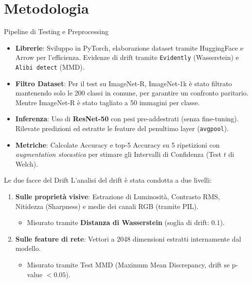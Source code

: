\documentclass[aspectratio=169]{beamer}
\begin{document}
\section{Metodologia}

\begin{frame}{Pipeline di Testing e Preprocessing}
    \begin{itemize}
        \item \textbf{Librerie}: Sviluppo in PyTorch, elaborazione dataset tramite HuggingFace e Arrow per l'efficienza. Evidenze di drift tramite \texttt{Evidently} (Wasserstein) e \texttt{Alibi detect} (MMD).
        \item \textbf{Filtro Dataset}: Per il test su ImageNet-R, ImageNet-1k è stato filtrato mantenendo solo le 200 classi in comune, per garantire un confronto paritario. Mentre ImageNet-R è stato tagliato a 50 immagini per classe.
        \item \textbf{Inferenza}: Uso di \textbf{ResNet-50} con pesi pre-addestrati (senza fine-tuning). Rilevate predizioni ed estratte le feature del penultimo layer (\texttt{avgpool}).
        \item \textbf{Metriche}: Calcolate Accuracy e top-5 Accuracy su 5 ripetizioni con \textit{augmentation stocastica} per stimare gli Intervalli di Confidenza (Test $t$ di Welch).
    \end{itemize}
\end{frame}

\begin{frame}{Le due facce del Drift}
    L'analisi del drift è stata condotta a due livelli:
    \vspace{0.4cm}
    \begin{enumerate}
        \item \textbf{Sulle proprietà visive}: Estrazione di Luminosità, Contrasto RMS, Nitidezza (Sharpness) e medie dei canali RGB (tramite PIL).
        \begin{itemize}
            \item Misurato tramite \textbf{Distanza di Wasserstein} (soglia di drift: $0.1$).
        \end{itemize}
        \vspace{0.3cm}
        \item \textbf{Sulle feature di rete}: Vettori a 2048 dimensioni estratti internamente dal modello.
        \begin{itemize}
            \item Misurato tramite Test MMD (Maximum Mean Discrepancy, drift se p-value $< 0.05$).
        \end{itemize}
    \end{enumerate}
\end{frame}
\end{document}
